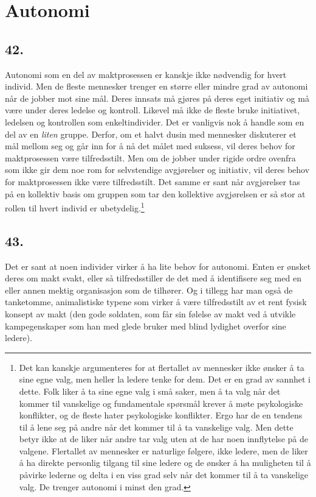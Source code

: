 \documentclass[oneside]{book}
\begin{document}
\chapter{Autonomi}
\section*{42.}
Autonomi som en del av maktprosessen er kanskje ikke nødvendig for hvert
individ. Men de fleste mennesker trenger en større eller mindre grad av
autonomi når de jobber mot sine mål. Deres innsats må gjøres på deres eget
initiativ og må være under deres ledelse og kontroll. Likevel må ikke de fleste
bruke initiativet, ledelsen og kontrollen som enkeltindivider. Det er vanligvis
nok å handle som en del av en {\em liten} gruppe. Derfor, om et halvt dusin med
mennesker diskuterer et mål mellom seg og går inn for å nå det målet med
suksess, vil deres behov for maktprosessen være tilfredsstilt. Men om de jobber
under rigide ordre ovenfra som ikke gir dem noe rom for selvstendige
avgjørelser og initiativ, vil deres behov for maktprosessen ikke være
tilfredsstilt. Det samme er sant når avgjørelser tas på en kollektiv basis om
gruppen som tar den kollektive avgjørelsen er så stor at rollen til hvert
individ er ubetydelig.\footnote{Det kan kanskje argumenteres for at flertallet
av mennesker ikke ønsker å ta sine egne valg, men heller la ledere tenke for
dem. Det er en grad av sannhet i dette. Folk liker å ta sine egne valg i små
saker, men å ta valg når det kommer til vanskelige og fundamentale spørsmål
krever å møte psykologiske konflikter, og de fleste hater psykologiske
konflikter. Ergo har de en tendens til å lene seg på andre når det kommer til å
ta vanskelige valg. Men dette betyr ikke at de liker når andre tar valg uten at
de har noen innflytelse på de valgene. Flertallet av mennesker er naturlige
følgere, ikke ledere, men de liker å ha direkte personlig tilgang til sine
ledere og de ønsker å ha muligheten til å påvirke lederne og delta i en viss
grad selv når det kommer til å ta vanskelige valg. De trenger autonomi i minst
den grad.}

\section*{43.}
Det er sant at noen individer virker å ha lite behov for autonomi. Enten er
ønsket deres om makt svakt, eller så tilfredsstiller de det med å identifisere
seg med en eller annen mektig organisasjon som de tilhører. Og i tillegg har
man også de tanketomme, animalistiske typene som virker å være tilfredsstilt av
et rent fysisk konsept av makt (den gode soldaten, som får sin følelse av makt
ved å utvikle kampegenskaper som han med glede bruker med blind lydighet
overfor sine ledere).
\end{document}
